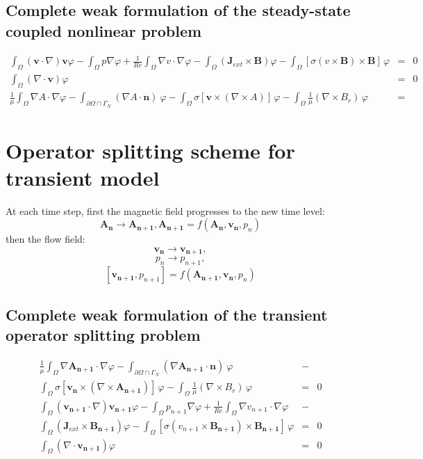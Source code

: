 \documentclass[smallextended]{svjour3}       %
\begin{document}
		\subsection{Complete weak formulation of the steady-state coupled nonlinear problem}
		\begin{eqnarray}
			\int_{\Omega} \left(\mathbf{v} \cdot \nabla\right)\mathbf{v} \varphi
			- \int_{\Omega} p \nabla \varphi
			+ \frac{1}{Re} \int_{\Omega} \nabla v \cdot \nabla \varphi
			- \int_{\Omega} \left(\mathbf{J}_{ext} \times \mathbf{B}\right) \varphi
			- \int_{\Omega} \left[\sigma \left(v \times \mathbf{B}\right) \times \mathbf{B}\right]\, \varphi
			& = & 0
			\\
			\int_{\Omega} \left(\nabla \cdot \mathbf{v}\right) \varphi & = & 0\\
			\frac{1}{\mu}\int_{\Omega}\nabla A \cdot \nabla \varphi - \int_{\partial \Omega \cap \Gamma_{N}} \left(\nabla A\cdot \mathbf{n}\right)\ \varphi 
			 - \int_{\Omega} \sigma \left[\mathbf{v} \times \left( \nabla \times A \right)\right]\,\varphi - \int_{\Omega}\frac{1}{\mu} \left(\nabla \times B_r \right)\,\varphi& = &
		\end{eqnarray}
		
		\section{Operator splitting scheme for transient model}
		At each time step, first the magnetic field progresses to the new time level:
		$$ \mathbf{A_n}\rightarrow\mathbf{A_{n+1}}, \mathbf{A_{n+1}} = f\left(\mathbf{A_n}, \mathbf{v_n}, p_n\right)$$
		then the flow field:
		$$ \mathbf{v_n}\rightarrow\mathbf{v_{n+1}},$$
		$$ p_n\rightarrow p_{n+1},$$
		$$ \left[\mathbf{v_{n+1}}, p_{n+1}\right] = f\left(\mathbf{A_{n+1}}, \mathbf{v_n}, p_n\right)$$
		
		\subsection{Complete weak formulation of the transient operator splitting problem}
		\begin{eqnarray}
			\frac{1}{\mu}\int_{\Omega}\nabla \mathbf{A_{n+1}} \cdot \nabla \varphi - \int_{\partial \Omega \cap \Gamma_{N}} \left(\nabla \mathbf{A_{n+1}}\cdot \mathbf{n}\right)\ \varphi 
			 & - &\\
			\int_{\Omega} \sigma \left[\mathbf{v_n} \times \left( \nabla \times \mathbf{A_{n+1}} \right)\right]\,\varphi - \int_{\Omega}\frac{1}{\mu} \left(\nabla \times B_r \right)\,\varphi& = & 0\\
			\int_{\Omega} \left(\mathbf{v_{n+1}} \cdot \nabla\right)\mathbf{v_{n+1}} \varphi
			- \int_{\Omega} p_{n+1} \nabla \varphi
			+ \frac{1}{Re} \int_{\Omega} \nabla v_{n+1} \cdot \nabla \varphi
			& - &\\\int_{\Omega} \left(\mathbf{J}_{ext} \times \mathbf{B_{n+1}}\right) \varphi
			- \int_{\Omega} \left[\sigma \left(v_{n+1} \times \mathbf{B_{n+1}}\right) \times \mathbf{B_{n+1}}\right]\, \varphi
			& = & 0
			\\
			\int_{\Omega} \left(\nabla \cdot \mathbf{v_{n+1}}\right) \varphi & = & 0
		\end{eqnarray}
		
\end{document}
